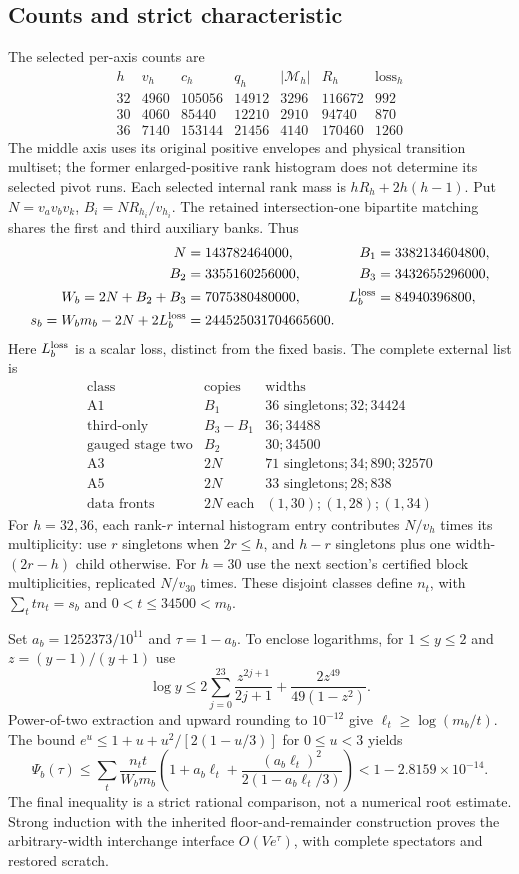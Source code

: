 \subsection{Counts and strict characteristic}
The selected per-axis counts are
\[
\begin{array}{c|rrrrrr}
h&v_h&c_h&q_h&|\mathcal M_h|&R_h&\text{loss}_h\\\hline
32&4960&105056&14912&3296&116672&992\\
30&4060&85440&12210&2910&94740&870\\
36&7140&153144&21456&4140&170460&1260
\end{array}
\]
The middle axis uses its original positive envelopes and physical
transition multiset; the former enlarged-positive rank histogram does
not determine its selected pivot runs. Each selected internal rank
mass is $hR_h+2h(h-1)$. Put $N=v_av_bv_k$, $B_i=NR_{h_i}/v_{h_i}$.
The retained intersection-one bipartite matching shares the first and
third auxiliary banks. Thus
\[
\begin{aligned}
N&=143782464000,& B_1&=3382134604800,\\
B_2&=3355160256000,& B_3&=3432655296000,\\
W_b=2N+B_2+B_3&=7075380480000,&L_b^{\rm loss}&=84940396800,\\
s_b=W_bm_b-2N+2L_b^{\rm loss}&=244525031704665600.
\end{aligned}
\]
Here $L_b^{\rm loss}$ is a scalar loss, distinct from the fixed basis.
The complete external list is
\[
\begin{array}{c|r|l}
\text{class}&\text{copies}&\text{widths}\\\hline
\text{A1}&B_1&36\text{ singletons};32;34424\\
\text{third-only}&B_3-B_1&36;34488\\
\text{gauged stage two}&B_2&30;34500\\
\text{A3}&2N&71\text{ singletons};34;890;32570\\
\text{A5}&2N&33\text{ singletons};28;838\\
\text{data fronts}&2N\text{ each}&(1,30);(1,28);(1,34)
\end{array}
\]
For $h=32,36$, each rank-$r$ internal histogram entry contributes
$N/v_h$ times its multiplicity: use $r$ singletons when $2r\le h$,
and $h-r$ singletons plus one width-$(2r-h)$ child otherwise.
For $h=30$ use the next section's certified block multiplicities,
replicated $N/v_{30}$ times. These disjoint classes define $n_t$,
with $\sum_ttn_t=s_b$ and $0<t\le34500<m_b$.

Set $a_b=1252373/10^{11}$ and $\tau=1-a_b$. To enclose logarithms,
for $1\le y\le2$ and $z=(y-1)/(y+1)$ use
\[
 \log y\le2\sum_{j=0}^{23}\frac{z^{2j+1}}{2j+1}
             +\frac{2z^{49}}{49(1-z^2)}.
\]
Power-of-two extraction and upward rounding to $10^{-12}$ give
$\ell_t\ge\log(m_b/t)$. The bound
$e^u\le1+u+u^2/[2(1-u/3)]$ for $0\le u<3$ yields
\[
 \Psi_b(\tau)\le\sum_t\frac{n_tt}{W_bm_b}
 \left(1+a_b\ell_t+\frac{(a_b\ell_t)^2}{2(1-a_b\ell_t/3)}\right)
 <1-2.8159\times10^{-14}.
\]
The final inequality is a strict rational comparison, not a numerical
root estimate. Strong induction with the inherited floor-and-remainder
construction proves the arbitrary-width interchange interface
$O(Ve^\tau)$, with complete spectators and restored scratch.
